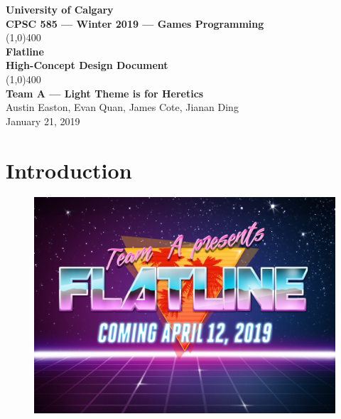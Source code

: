 \documentclass{article}
\newcommand{\name}{Flatline}
\newcommand{\team}{Team A --- Light Theme is for Heretics}
\theoremstyle{definition}
\begin{document}
\begin{titlepage}
  \begin{center}
    \vspace*{1cm}
    \Large{\textbf{University of Calgary}}\\
    \Large{\textbf{CPSC 585 --- Winter 2019 --- Games Programming}}\\
    \vfill
    \line(1,0){400}\\[1mm]
    \huge{\textbf{\name{}}}\\
    \large{\textbf{High-Concept Design Document}}\\
    \line(1,0){400}\\
    \vfill
    \Large{\textbf{\team{}}}\\
    \Large{Austin Easton, Evan Quan, James Cote, Jianan Ding}\\
    \large{January 21, 2019}
  \end{center}
\end{titlepage}
\setcounter{page}{0}
\tableofcontents
{}
\break{}

\section{Introduction}

\begin{figure}[htpb]
  \centering
  \includegraphics[width=1.0\linewidth]{title_art.jpg}
\label{fig:title_art}
\end{figure}
\end{document}
